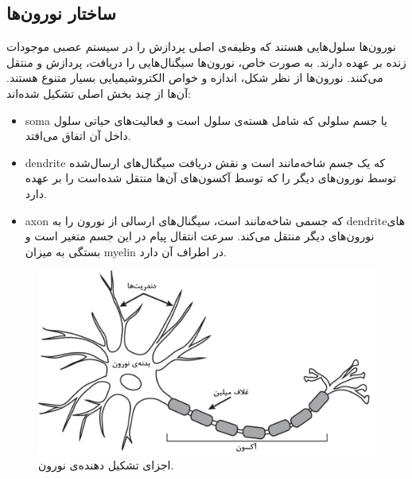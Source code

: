 \documentclass[12pt]{report}
\begin{document}
	\subsection{ساختار نورون‌ها}
	
	نورون‌ها سلول‌هایی هستند که وظیفه‌ی اصلی پردازش را در سیستم عصبی موجودات زنده بر عهده دارند. به صورت خاص، نورون‌ها سیگنال‌هایی را دریافت، پردازش و منتقل می‌کنند. نورون‌ها از نظر شکل، اندازه و خواص الکتروشیمیایی بسیار متنوع هستند. آن‌ها از چند بخش اصلی تشکیل شده‌اند:
	\begin{itemize}
		\item \gls{soma} یا جسم سلولی که شامل هسته‌ی سلول است و فعالیت‌های حیاتی سلول داخل آن اتفاق می‌افتد.
		\item \gls{dendrite} که یک جسم شاخه‌مانند است و نقش دریافت سیگنال‌های ارسال‌شده توسط نورون‌های دیگر را که توسط آکسون‌های آن‌ها منتقل شده‌است را بر عهده دارد.
		\item \gls{axon} که جسمی شاخه‌مانند است، سیگنال‌های ارسالی از نورون را به \gls{dendrite}‌های نورون‌های دیگر منتقل می‌کند. سرعت انتقال پیام‌‌ در این جسم متغیر است و بستگی به میزان \gls{myelin} در اطراف آن دارد.
	\end{itemize}
	
	\begin{figure}[H]
		\centering
		\includegraphics[width=0.7\linewidth]{neuron.jpg}
		\caption[NS]{
			اجزای تشکیل دهنده‌ی نورون\footnotemark.
		}
		\label{fig:neuron}
	\end{figure}
	
	
\end{document}

